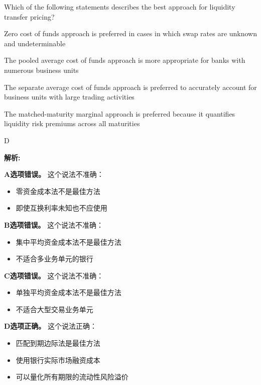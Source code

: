 \documentclass{article}
\newcounter{question} %
\newenvironment{explanation}
{\textbf{解析:}\par}
{\par}
\begin{document}
\begin{question}
    Which of the following statements describes the best approach for liquidity transfer pricing?
\end{question}

\begin{choices}
    \item Zero cost of funds approach is preferred in cases in which swap rates are unknown and undeterminable
    \item The pooled average cost of funds approach is more appropriate for banks with numerous business units
    \item The separate average cost of funds approach is preferred to accurately account for business units with large trading activities
    \item The matched-maturity marginal approach is preferred because it quantifies liquidity risk premiums across all maturities
\end{choices}

\begin{correctanswer}
    D
\end{correctanswer}

\begin{explanation}
    \textbf{A选项错误。}
    这个说法不准确：
    \begin{itemize}
        \item 零资金成本法不是最佳方法
        \item 即使互换利率未知也不应使用
    \end{itemize}

    \textbf{B选项错误。}
    这个说法不准确：
    \begin{itemize}
        \item 集中平均资金成本法不是最佳方法
        \item 不适合多业务单元的银行
    \end{itemize}

    \textbf{C选项错误。}
    这个说法不准确：
    \begin{itemize}
        \item 单独平均资金成本法不是最佳方法
        \item 不适合大型交易业务单元
    \end{itemize}

    \textbf{D选项正确。}
    这个说法正确：
    \begin{itemize}
        \item 匹配到期边际法是最佳方法
        \item 使用银行实际市场融资成本
        \item 可以量化所有期限的流动性风险溢价
    \end{itemize}
\end{explanation}
\end{document}
